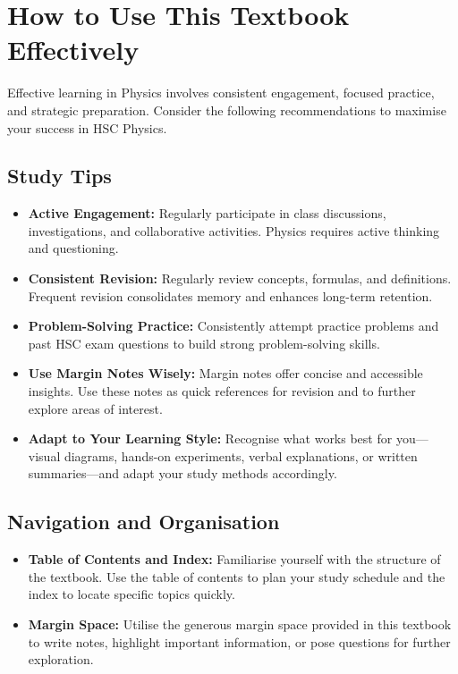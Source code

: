 \section{How to Use This Textbook Effectively}
\FloatBarrier

Effective learning in Physics involves consistent engagement, focused practice, and strategic preparation. Consider the following recommendations to maximise your success in HSC Physics.

\subsection{Study Tips}
\FloatBarrier

\begin{itemize}
\item \textbf{Active Engagement:} Regularly participate in class discussions, investigations, and collaborative activities. Physics requires active thinking and questioning.
\item \textbf{Consistent Revision:} Regularly review concepts, formulas, and definitions. Frequent revision consolidates memory and enhances long-term retention.
\item \textbf{Problem-Solving Practice:} Consistently attempt practice problems and past HSC exam questions to build strong problem-solving skills.
\item \textbf{Use Margin Notes Wisely:} Margin notes offer concise and accessible insights. Use these notes as quick references for revision and to further explore areas of interest.
\item \textbf{Adapt to Your Learning Style:} Recognise what works best for you—visual diagrams, hands-on experiments, verbal explanations, or written summaries—and adapt your study methods accordingly.
\end{itemize}

\subsection{Navigation and Organisation}
\FloatBarrier

\begin{itemize}
\item \textbf{Table of Contents and Index:} Familiarise yourself with the structure of the textbook. Use the table of contents to plan your study schedule and the index to locate specific topics quickly.
\item \textbf{Margin Space:} Utilise the generous margin space provided in this textbook to write notes, highlight important information, or pose questions for further exploration.
\end{itemize}

